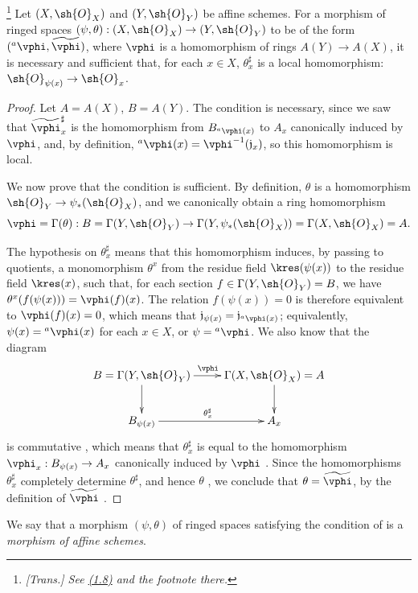 \begin{theorem}[1.7.3]
\label{I.1.7.3}
\footnote{\emph{[Trans.] See \hyperref[subsection:I.1.8]{(1.8)} and the footnote there.}}
Let $(X,\sh{O}_X)$ and $(Y,\sh{O}_Y)$ be affine schemes.
For a morphism of ringed spaces $(\psi,\theta):(X,\sh{O}_X)\to(Y,\sh{O}_Y)$ to be of the form $({}^a\vphi,\widetilde{\vphi})$, where $\vphi$ is a homomorphism of rings $A(Y)\to A(X)$, it is necessary and sufficient that, for each $x\in X$, $\theta_x^\sharp$ is a local homomorphism: $\sh{O}_{\psi(x)}\to\sh{O}_x$.
\end{theorem}

\begin{proof}
Let $A=A(X)$, $B=A(Y)$.
The condition is necessary, since we saw  that $\widetilde{\vphi}_x^\sharp$ is the homomorphism from $B_{{}^a\vphi(x)}$ to $A_x$ canonically induced by $\vphi$, and, by definition, ${}^a\vphi(x)=\vphi^{-1}(\mathfrak{j}_x)$, so this homomorphism is local.

We now prove that the condition is sufficient.
By definition, $\theta$ is a homomorphism $\sh{O}_Y\to\psi_*(\sh{O}_X)$, and we canonically obtain a ring homomorphism
\[
  \vphi=\Gamma(\theta):B=\Gamma(Y,\sh{O}_Y)
  \to\Gamma(Y,\psi_*(\sh{O}_X))=\Gamma(X,\sh{O}_X)=A.
\]

The hypothesis on $\theta_x^\sharp$ means that this homomorphism induces, by passing to quotients, a monomorphism $\theta^x$ from the residue field $\kres(\psi(x))$ to the residue field $\kres(x)$, such that, for each section $f\in\Gamma(Y,\sh{O}_Y)=B$, we have $\theta^x(f(\psi(x)))=\vphi(f)(x)$.
The relation $f(\psi(x))=0$ is therefore equivalent to $\vphi(f)(x)=0$, which means that $\mathfrak{j}_{\psi(x)}=\mathfrak{j}_{{}^a\vphi(x)}$; equivalently, $\psi(x)={}^a\vphi(x)$ for each $x\in X$, or $\psi={}^a\vphi$.
We also know that the diagram
\[
  \xymatrix{
    B=\Gamma(Y,\sh{O}_Y)\ar[r]^\vphi\ar[d] &
    \Gamma(X,\sh{O}_X)=A\ar[d]\\
    B_{\psi(x)}\ar[r]^{\theta_x^\sharp} &
    A_x
  }
\]
is commutative , which means that $\theta_x^\sharp$ is equal to the homomorphism $\vphi_x:B_{\psi(x)}\to A_x$ canonically induced by $\vphi$ .
Since the homomorphisms $\theta_x^\sharp$ completely determine $\theta^\sharp$, and hence $\theta$ , we conclude that $\theta=\widetilde{\vphi}$, by the definition of $\widetilde{\vphi}$ .
\end{proof}

We say that a morphism $(\psi,\theta)$ of ringed spaces satisfying the condition of  is a \emph{morphism of affine schemes}.

